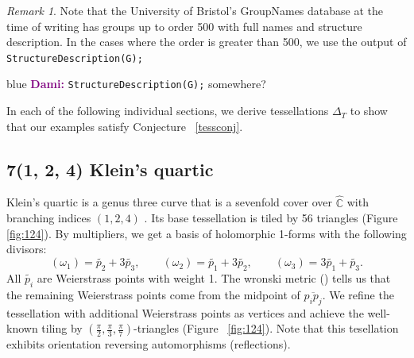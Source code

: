 \documentclass[12pt,reqno]{amsart}
\newenvironment{dami}{
  \medskip
\begin{color}{blue}
    \textcolor{purple}{\textbf{Dami:}} 
}{
\end{color}
  \medskip
}
\newcommand{\C}{\mathbb{C}}
\theoremstyle{definition}
\theoremstyle{remark}
\newtheorem*{remark}{Remark}
\begin{document}
\begin{remark} Note that the University of Bristol's GroupNames database at the time of writing has groups up to order 500 with full names and structure description. In the cases where the order is greater than 500, we use the output of \texttt{StructureDescription(G);}  \end{remark}

\begin{dami} \texttt{StructureDescription(G);} somewhere? \end{dami}


In each of the following individual sections, we derive tessellations $\Delta_T$ to show that our examples satisfy Conjecture ~\ref{tessconj}.



\subsection*{7(1, 2, 4) Klein's quartic } 



Klein's quartic is a genus three curve that is a sevenfold cover over $\widehat{\C}$ with branching indices $(1,2,4)$ \cite{kw}. Its base tessellation is tiled by 56 triangles (Figure~ \cref{fig:124}). By multipliers, we get a basis of holomorphic 1-forms with the following divisors: $$(\omega_1) = \widetilde{p_2} + 3 \widetilde{p_3}, \qquad (\omega_2) = \widetilde{p_1} + 3 \widetilde{p_2}, \qquad (\omega_3) = 3 \widetilde{p_1} + \widetilde{p_3}.$$ All $\widetilde{p_i}$ are Weierstrass points with weight 1. The wronski metric (\cite{code:wronski}) tells us that the remaining Weierstrass points come from the midpoint of $\overline{p_i p_j}.$ We refine the tessellation with additional Weierstrass points as vertices and achieve the well-known tiling by $(\frac{\pi}{2}, \frac{\pi}{3}, \frac{\pi}{7})$-triangles (Figure~ \cref{fig:124}). Note that this tesellation exhibits orientation reversing automorphisms (reflections). 
\end{document}
